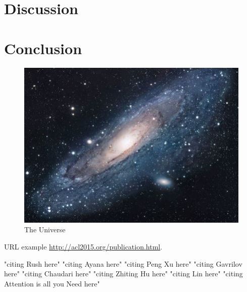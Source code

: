 \documentclass[11pt]{article}
\begin{document}
\section{Discussion}
\section{Conclusion}

\begin{figure}[h!]
\centering
\includegraphics[scale=1.7]{universe}
\caption{The Universe}
\label{fig:universe}
\end{figure}

URL example
\url{http://acl2015.org/publication.html}.

"citing Rush here" \citep{rush2015neural}
"citing Ayana here" \cite{Ayana2017}
"citing Peng Xu here" \cite{DBLP:journals/corr/abs-1902-07110}
"citing Gavrilov here" \cite{DBLP:journals/corr/abs-1901-07786}
"citing Chaudari here" \cite{DBLP:journals/corr/abs-1802-09426}
"citing Zhiting Hu here" \cite{DBLP:journals/corr/HuYLSX17}
"citing Lin here" \cite{lin-2004-rouge}
"citing Attention is all you Need here" \cite{DBLP:journals/corr/VaswaniSPUJGKP17}



\end{document}
